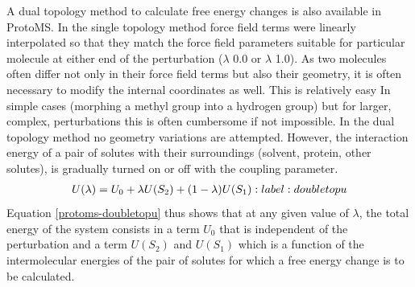 \documentclass[letterpaper,10pt,english]{sphinxmanual}
\begin{document}
A dual topology method to calculate free energy changes is also available in ProtoMS. In the single topology method force field terms were linearly interpolated so that they match the force field parameters suitable for particular molecule at either end of the perturbation (\(\lambda\) 0.0 or \(\lambda\) 1.0). As two molecules often differ not only in their force field terms but also their geometry, it is often necessary to modify the internal coordinates as well. This is relatively easy In simple cases (morphing a methyl group into a hydrogen group) but for larger, complex, perturbations this is often cumbersome if not impossible. In the dual topology method no geometry variations are attempted. However, the interaction energy of a pair of solutes with their surroundings (solvent, protein, other solutes), is gradually turned on or off with the coupling parameter.
\begin{gather}
\begin{split}U(\lambda) = U_{0} + \lambda U(S_{2}) + (1 - \lambda) U(S_{1})
:label:doubletopu\end{split}\notag
\end{gather}
Equation \eqref{protoms-doubletopu} thus shows that at any given value of \(\lambda\), the total energy of the system consists in a term \(U_{0}\) that is independent of the perturbation and a term \(U(S_{2})\) and \(U(S_{1})\) which is a function of the intermolecular energies of the pair of solutes for which a free energy change is to be calculated.
\end{document}
